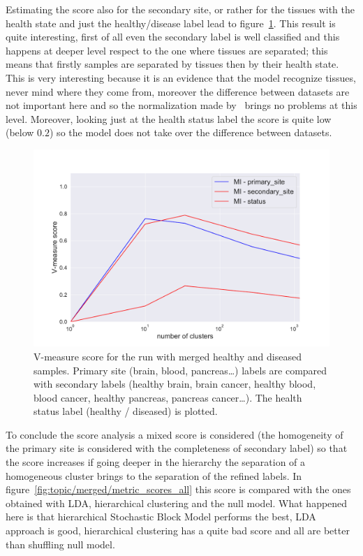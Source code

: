 Estimating the score also for the secondary site, or rather for the tissues with the health state and just the healthy/disease label lead to figure~\ref{fig:topic/merged/metric_scores}. This result is quite interesting, first of all even the secondary label is well classified and this happens at deeper level respect to the one where tissues are separated; this means that firstly samples are separated by tissues then by their health state. This is very interesting because it is an evidence that the model recognize tissues, never mind where they come from, moreover the difference between datasets are not important here and so the normalization made by~\cite{Betel2018} brings no problems at this level. Moreover, looking just at the health status label the score is quite low (below $0.2$) so the model does not take over the difference between datasets.
\begin{figure}[htb!]
    \centering
    \includegraphics[width=0.8\linewidth]{pictures/topic/merged/metric_scores.pdf}
    \caption{V-measure score for the run with merged healthy and diseased samples. Primary site (brain, blood, pancreas\ldots) labels are compared with secondary labels (healthy brain, brain cancer, healthy blood, blood cancer, healthy pancreas, pancreas cancer\ldots). The health status label (healthy / diseased) is plotted.}
    \label{fig:topic/merged/metric_scores}
\end{figure}
To conclude the score analysis a mixed score is considered (the homogeneity of the primary site is considered with the completeness of secondary label) so that the score increases if going deeper in the hierarchy the separation of a homogeneous cluster brings to the separation of the refined labels. In figure~\ref{fig:topic/merged/metric_scores_all} this score is compared with the ones obtained with LDA, hierarchical clustering and the null model. What happened here is that hierarchical Stochastic Block Model performs the best, LDA approach is good, hierarchical clustering has a quite bad score and all are better than shuffling null model.
